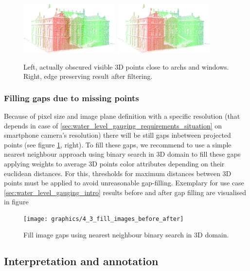 \documentclass[review]{elsarticle}
\begin{document}
\begin{figure}[h]
\centering
\includegraphics[width=5cm]{graphics/4_3_dist_image_orig}%
\includegraphics[width=5cm]{graphics/4_3_dist_image_filt}%
\caption{Left, actually obscured visible 3D points close to archs and windows. Right, edge preserving result after filtering.}
\label{fig:4_3_dist_images}
\end{figure}


\subsubsection{Filling gaps due to missing points}
Because of pixel size and image plane definition with a specific resolution (that depends in case of \ref{sec:water_level_gauging_requirements_situation} on smartphone camera's resolution) there will be still gaps inbetween projected points (see figure \ref{fig:4_3_dist_images}, right). To fill these gaps, we recommend to use a simple nearest neighbour approach using binary search \cite{Bentley1975} in 3D domain to fill these gaps applying weights to average 3D points color attributes depending on their euclidean distances. For this, thresholds for maximum distances between 3D points must be applied to avoid unreasonable gap-filling. Exemplary for use case \ref{sec:water_level_gauging_intro} results before and after gap filling are visualised in figure \
\begin{figure}[h]
\centering
\texttt{[image: graphics/4\_3\_fill\_images\_before\_after]}
\caption{Fill image gaps using nearest neighbour binary search in 3D domain.}
\label{fig:4_3_fill_images_before_after}
\end{figure}


\subsection{Interpretation and annotation}
\end{document}
